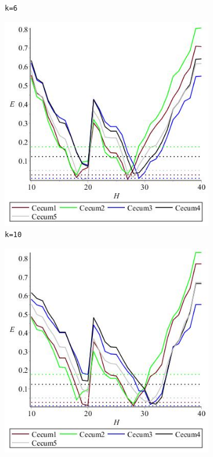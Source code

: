 \documentclass[../../main.tex]{subfiles}
\begin{document}
\begin{figure}[H]
\begin{subfigure}[b]{.45\textwidth}
\caption{\texttt{k=6}}
\end{subfigure}
\begin{subfigure}[b]{.45\textwidth}
\includegraphics[width=\textwidth]{precision/minmax/k10cecum}
\caption{\texttt{k=10}}
\end{subfigure}
\begin{subfigure}[b]{.45\textwidth}
\includegraphics[width=\textwidth]{precision/minmax/k11cecum}

\end{subfigure}
\end{figure}
\end{document}

